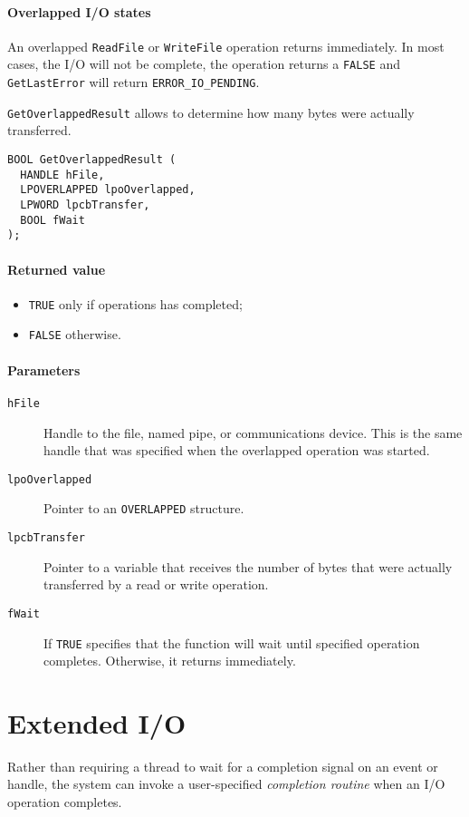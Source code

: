 \paragraph{Overlapped I/O states}
An overlapped \texttt{ReadFile} or \texttt{WriteFile} operation returns immediately. In most cases, the I/O will not be complete, the operation returns a \texttt{FALSE} and \texttt{GetLastError} will return \texttt{ERROR\_IO\_PENDING}.

\texttt{GetOverlappedResult} allows to determine how many bytes were actually transferred.

\begin{verbatim}
BOOL GetOverlappedResult (
  HANDLE hFile,
  LPOVERLAPPED lpoOverlapped,
  LPWORD lpcbTransfer,
  BOOL fWait
);
\end{verbatim}

\paragraph{Returned value}
\begin{itemize}
\item \texttt{TRUE} only if operations has completed;
\item \texttt{FALSE} otherwise.
\end{itemize}

\paragraph{Parameters}
\begin{description}
\item [\texttt{hFile}] Handle to the file, named pipe, or communications device. This is the same handle that was specified when the overlapped operation was started.
\item [\texttt{lpoOverlapped}] Pointer to an \texttt{OVERLAPPED} structure.
\item [\texttt{lpcbTransfer}] Pointer to a variable that receives the number of bytes that were actually transferred by a read or write operation.
\item [\texttt{fWait}] If \texttt{TRUE} specifies that the function will wait until specified operation completes. Otherwise, it returns immediately.
\end{description}

\section{Extended I/O}
Rather than requiring a thread to wait for a completion signal on an event or handle, the system can invoke a user-specified \emph{completion routine} when an I/O operation completes.

